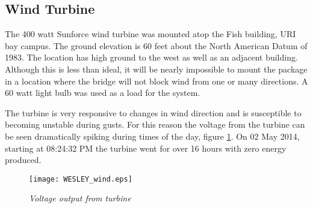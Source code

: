 \subsection{Wind Turbine}

The 400 watt Sunforce wind turbine was mounted atop the Fish building, URI bay campus. The ground elevation is 60 feet about the North American Datum of 1983. The location has high ground to the west as well as an adjacent building. Although this is less than ideal, it will be nearly impossible to mount the package in a location where the bridge will not block wind from one or many directions.  A 60 watt light bulb was used as a load for the system. 

\indent The turbine is very responsive to changes in wind direction and is susceptible to becoming unstable during gusts. For this reason the voltage from the turbine can be seen dramatically spiking during times of the day, figure \ref{fig:wind}. On 02 May 2014, starting at 08:24:32 PM the turbine went for over 16 hours with zero energy produced. 

\begin{figure}
\centering
\texttt{[image: WESLEY\_wind.eps]}
\caption{\textit{Voltage output from turbine}}
\label{fig:wind}
\end{figure}